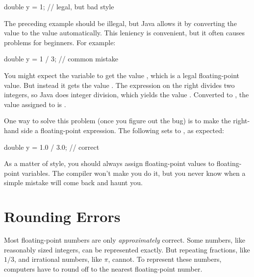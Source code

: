 \begin{code}
double y = 1;  // legal, but bad style
\end{code}

The preceding example should be illegal, but Java allows it by converting the  value  to the  value  automatically.
This leniency is convenient, but it often causes problems for beginners.
For example:

\begin{code}
double y = 1 / 3;  // common mistake
\end{code}


You might expect the variable  to get the value , which is a legal floating-point value.
But instead it gets the value .
The expression on the right divides two integers, so Java does integer division, which yields the  value .
Converted to , the value assigned to  is .

One way to solve this problem (once you figure out the bug) is to make the right-hand side a floating-point expression.
The following sets  to , as expected:

\begin{code}
double y = 1.0 / 3.0;  // correct
\end{code}

As a matter of style, you should always assign floating-point values to floating-point variables.
The compiler won't make you do it, but you never know when a simple mistake will come back and haunt you.


\section{Rounding Errors}
\label{rounderr}


Most floating-point numbers are only {\em approximately} correct.
Some numbers, like reasonably sized integers, can be represented exactly.
But repeating fractions, like $1/3$, and irrational numbers, like $\pi$, cannot.
To represent these numbers, computers have to round off to the nearest floating-point number.

